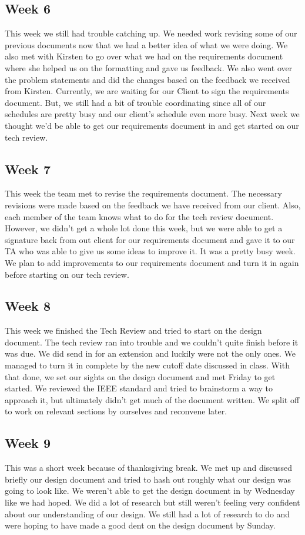 \documentclass[onecolumn, draftclsnofoot,10pt, compsoc]{IEEEtran}
\begin{document}
\subsection{Week 6}
This week we still had trouble catching up.
We needed work revising some of our previous documents now that we had a better idea of what we were doing.
We also met with Kirsten to go over what we had on the requirements document where she helped us on the formatting and gave us feedback.
We also went over the problem statements and did the changes based on the feedback we received from Kirsten.
Currently, we are waiting for our Client to sign the requirements document.
But, we still had a bit of trouble coordinating since all of our schedules are pretty busy and our client's schedule even more busy.
Next week we thought we'd be able to get our requirements document in and get started on our tech review.

\subsection{Week 7}
This week the team met to revise the requirements document.
The necessary revisions were made based on the feedback we have received from our client.
Also, each member of the team knows what to do for the tech review document.
However, we didn't get a whole lot done this week, but we were able to get a signature back from out client for our requirements document and gave it to our TA who was able to give us some ideas to improve it.
It was a pretty busy week. We plan to add improvements to our requirements document and turn it in again before starting on our tech review.

\subsection{Week 8}
This week we finished the Tech Review and tried to start on the design document.
The tech review ran into trouble and we couldn't quite finish before it was due.
We did send in for an extension and luckily were not the only ones.
We managed to turn it in complete by the new cutoff date discussed in class.
With that done, we set our sights on the design document and met Friday to get started.
We reviewed the IEEE standard and tried to brainstorm a way to approach it, but ultimately didn't get much of the document written.
We split off to work on relevant sections by ourselves and reconvene later.

\subsection{Week 9}
This was a short week because of thanksgiving break.
We met up and discussed briefly our design document and tried to hash out roughly what our design was going to look like.
We weren't able to get the design document in by Wednesday like we had hoped.
We did a lot of research but still weren't feeling very confident about our understanding of our design.
We still had a lot of research to do and were hoping to have made a good dent on the design document by Sunday.
\end{document}

